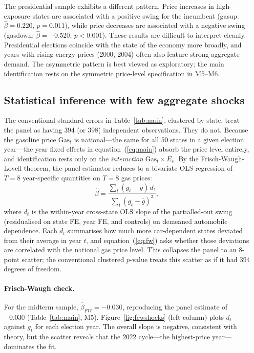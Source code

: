 \documentclass[12pt]{article}
\begin{document}
The presidential sample exhibits a different pattern. Price increases in high-exposure states are associated with a positive swing for the incumbent (gasup: $\hat\beta=0.220$, $p=0.011$), while price decreases are associated with a negative swing (gasdown: $\hat\beta=-0.520$, $p<0.001$). These results are difficult to interpret cleanly. Presidential elections coincide with the state of the economy more broadly, and years with rising energy prices (2000, 2004) often also feature strong aggregate demand. The asymmetric pattern is best viewed as exploratory; the main identification rests on the symmetric price-level specification in M5--M6.

\subsection{Statistical inference with few aggregate shocks}
\label{sec:fewshocks}

The conventional standard errors in Table~\ref{tab:main}, clustered by state, treat the panel as having 394 (or 398) independent observations. They do not. Because the gasoline price $\mathrm{Gas}_t$ is national---the same for all 50 states in a given election year---the year fixed effects in equation~(\ref{eq:main}) absorb the price level entirely, and identification rests only on the \textit{interaction} $\mathrm{Gas}_t \times E_s$. By the Frisch-Waugh-Lovell theorem, the panel estimator reduces to a bivariate OLS regression of $T=8$ year-specific quantities on $T=8$ gas prices:
\begin{equation}
  \hat\beta = \frac{\sum_{t}(g_t - \bar g)\,d_t}{\sum_{t}(g_t - \bar g)^2},
  \label{eq:fw}
\end{equation}
where $d_t$ is the within-year cross-state OLS slope of the partialled-out swing (residualised on state FE, year FE, and controls) on demeaned automobile dependence. Each $d_t$ summarises how much more car-dependent states deviated from their average in year $t$, and equation~(\ref{eq:fw}) asks whether those deviations are correlated with the national gas price level. This collapses the panel to an 8-point scatter; the conventional clustered $p$-value treats this scatter as if it had 394 degrees of freedom.

\paragraph{Frisch-Waugh check.}
For the midterm sample, $\hat\beta_{FW}=-0.030$, reproducing the panel estimate of $-0.030$ (Table~\ref{tab:main}, M5). Figure~\ref{fig:fewshocks} (left column) plots $d_t$ against $g_t$ for each election year. The overall slope is negative, consistent with theory, but the scatter reveals that the 2022 cycle---the highest-price year---dominates the fit.
\end{document}
